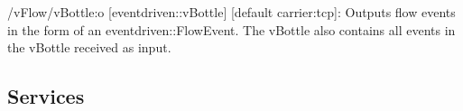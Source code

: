 \begin{DoxyItemize}
\item /v\+Flow/v\+Bottle\+:o \mbox{[}eventdriven\+::v\+Bottle\mbox{]} \mbox{[}default carrier\+:tcp\mbox{]}\+: Outputs flow events in the form of an eventdriven\+::\+Flow\+Event. The v\+Bottle also contains all events in the v\+Bottle received as input.
\end{DoxyItemize}\hypertarget{group__zynqGrabber_services_sec}{}\subsection{Services}\label{group__zynqGrabber_services_sec}

